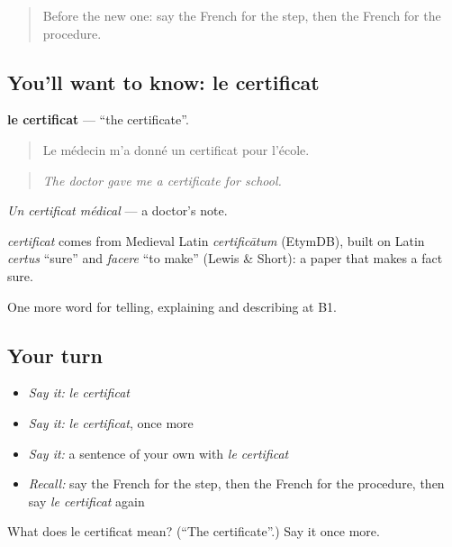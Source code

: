 \begin{quote}
Before the new one: say the French for the step, then the French for the procedure.
\end{quote}

\subsection*{You'll want to know: le certificat}
\textbf{le certificat} — \textquotedblleft{}the certificate\textquotedblright{}.

\begin{quote}
Le médecin m'a donné un certificat pour l'école.
\end{quote}

\begin{quote}
\emph{The doctor gave me a certificate for school.}
\end{quote}

\emph{Un certificat médical} — a doctor's note.

\begin{cousinweb}
\emph{certificat} comes from Medieval Latin \emph{certificātum} (EtymDB), built on Latin \emph{certus} \textquotedblleft{}sure\textquotedblright{} and \emph{facere} \textquotedblleft{}to make\textquotedblright{} (Lewis \& Short): a paper that makes a fact sure.
\end{cousinweb}

\begin{grammarlens}[title={What you've built}]
One more word for telling, explaining and describing at B1.
\end{grammarlens}

\subsection*{Your turn}
\begin{itemize}
\raggedright
  \item \emph{Say it:} \emph{le certificat}
  \item \emph{Say it:} \emph{le certificat}, once more
  \item \emph{Say it:} a sentence of your own with \emph{le certificat}
  \item \emph{Recall:} say the French for the step, then the French for the procedure, then say \emph{le certificat} again
\end{itemize}

\begin{tcolorbox}[breakable,colback=teal!4,colframe=teal!35!black,title={Before you move on}]
What does le certificat mean? (\textquotedblleft{}The certificate\textquotedblright{}.) Say it once more.
\end{tcolorbox}
